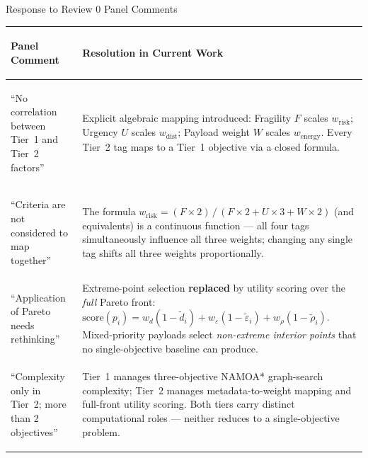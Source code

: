 \documentclass[aspectratio=169,11pt]{beamer}
\begin{document}
\begin{frame}{Response to Review 0 Panel Comments}
  \scriptsize
  \begin{tabularx}{\textwidth}{>{\bfseries\raggedright\arraybackslash}p{3.6cm} Y}
    \toprule
    \textbf{Panel Comment} & \textbf{Resolution in Current Work}\\
    \midrule
    ``No correlation between Tier~1 and Tier~2 factors'' &
      Explicit algebraic mapping introduced: Fragility $F$ scales
      $w_\mathrm{risk}$; Urgency $U$ scales $w_\mathrm{dist}$; Payload
      weight $W$ scales $w_\mathrm{energy}$.  Every Tier~2 tag maps to a
      Tier~1 objective via a closed formula.\\[5pt]
    ``Criteria are not considered to map together'' &
      The formula $w_\mathrm{risk}=(F{\times}2)\,/\,(F{\times}2+U{\times}3+W{\times}2)$
      (and equivalents) is a continuous function --- all four tags simultaneously
      influence all three weights; changing any single tag shifts all three weights
      proportionally.\\[5pt]
    ``Application of Pareto needs rethinking'' &
      Extreme-point selection \textbf{replaced} by utility scoring over the
      \emph{full} Pareto front:
      $\mathrm{score}(p_i)=w_d(1{-}\tilde{d}_i)+w_\varepsilon(1{-}\tilde{\varepsilon}_i)+w_\rho(1{-}\tilde{\rho}_i)$.
      Mixed-priority payloads select \emph{non-extreme interior points} that
      no single-objective baseline can produce.\\[5pt]
    ``Complexity only in Tier~2; more than 2 objectives'' &
      Tier~1 manages three-objective NAMOA* graph-search complexity;
      Tier~2 manages metadata-to-weight mapping and full-front utility scoring.
      Both tiers carry distinct computational roles --- neither reduces to a
      single-objective problem.\\
    \bottomrule
  \end{tabularx}
\end{frame}
\end{document}
